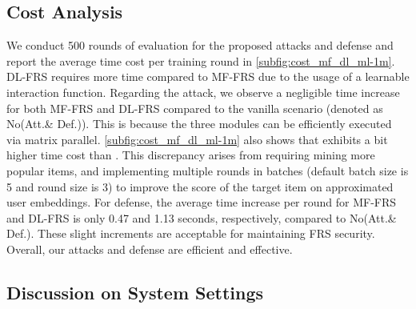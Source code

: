 \subsection{Cost Analysis}
\label{ssec:cost_analysis}
We conduct 500 rounds of evaluation for the proposed attacks and defense and report the average time cost per training round in \cref{subfig:cost_mf_dl_ml-1m}. DL-FRS requires more time compared to MF-FRS due to the usage of a learnable interaction function.
Regarding the attack, we observe a negligible time increase for both 
MF-FRS and DL-FRS compared to the vanilla scenario (denoted as No(Att.\& Def.)). 
This is because the three \model{} modules can be efficiently executed via matrix parallel.
\cref{subfig:cost_mf_dl_ml-1m} also shows that \modelII{} exhibits a bit higher time cost than \modelI{}. 
This discrepancy arises from \modelII{} requiring mining more popular items, and implementing multiple rounds in batches (default batch size is 5 and round size is 3) to improve the score of the target item on approximated user embeddings.
For defense, the average time increase per round for MF-FRS and DL-FRS is only 0.47 and 1.13 seconds, respectively, compared to No(Att.\& Def.).
These slight increments are acceptable for maintaining FRS security. Overall, our attacks and defense are efficient and effective.

\subsection{Discussion on System Settings}
\label{ssec:system_setting_discussion}

